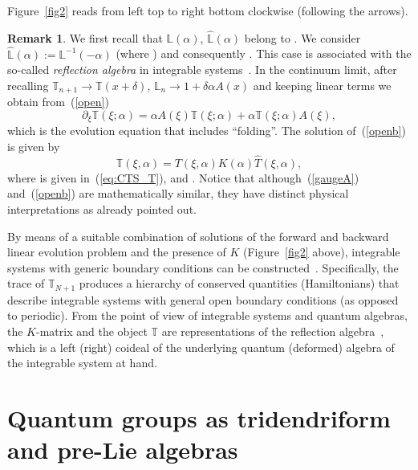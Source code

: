 \documentclass[pdftex]{sigma}
\numberwithin{equation}{section}
\theoremstyle{definition}
\newtheorem{rem}[thm]{Remark}
\DeclareMathOperator{\EEnd}{End}%
\begin{document}
Figure~\ref{fig2} reads from left top to right bottom clockwise (following the arrows).

\begin{rem}%
We first recall that
${\mathbb L}(\alpha)$, $\hat {\mathbb L}(\alpha)$ belong to \smash{$\EEnd\bigl({\mathbb C}^{\mathcal N}\bigr) \otimes {\mathfrak A}$}. We consider $\hat {\mathbb L}(\alpha) := {\mathbb L}^{-1}(-\alpha)$
\big(where \big) and consequently . This case is associated with the so-called {\it reflection algebra} in integrable systems~\cite{Cherednik, Sklyaninb}.
In the continuum limit, after recalling ${\mathbb T}_{n+1} \to {\mathbb T}(x + \delta)$, ${\mathbb L}_n \to 1 + \delta\alpha A(x)$ and keeping linear terms we obtain from~(\ref{open})
\begin{equation}
\partial_{\xi}{\mathbb T}(\xi; \alpha) = \alpha A(\xi){ \mathbb T}(\xi; \alpha) + \alpha { \mathbb T}(\xi; \alpha) A(\xi), \label{openb}
\end{equation}
which is the evolution equation that includes ``folding''. The solution of~(\ref{openb}) is given by
\[
{\mathbb T}(\xi, \alpha) = T(\xi, \alpha) K(\alpha) \hat T(\xi, \alpha),
\]
 where  is given in~(\ref{eq:CTS_T}), and .
 Notice that although~(\ref{gaugeA}) and~(\ref{openb}) are mathematically similar, they have distinct physical interpretations as already pointed out.
\end{rem}

By means of a suitable combination of solutions of the forward and backward linear evolution problem and the presence of $K$ (Figure~\ref{fig2} above), integrable systems with generic boundary conditions can be constructed~\cite{Sklyanin, Sklyaninb}. Specifically, the trace of ${\mathbb T}_{N+1}$ produces a hierarchy of conserved quantities (Hamiltonians) that describe integrable systems with general open boundary conditions (as opposed to periodic). From the point of view of integrable systems and quantum algebras, the $K$-matrix and the object ${\mathbb T}$ are representations of the reflection algebra~\cite{Cherednik, Sklyanin, Sklyaninb}, which is a left (right) coideal of the underlying quantum (deformed) algebra of the integrable system at hand.

\section{Quantum groups as tridendriform and pre-Lie algebras}\label{section4}
\end{document}
